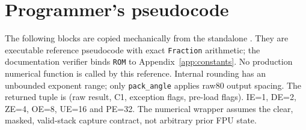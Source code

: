 \documentclass[11pt]{article}
\begin{document}


\clearpage
\section{Programmer's pseudocode}
\label{app:pseudocode}

The following blocks are copied mechanically from the standalone
. They are executable reference pseudocode with exact
\texttt{Fraction} arithmetic; the documentation verifier binds
\texttt{ROM} to Appendix~\ref{app:constants}. No production numerical
function is called by this reference. Internal rounding has an unbounded
exponent range; only \texttt{pack\_angle} applies raw80 output spacing.
The returned tuple is (raw result, C1, exception flags, pre-load flags).
IE=1, DE=2, ZE=4, OE=8, UE=16 and PE=32. The numerical wrapper assumes the
clear, masked, valid-stack capture contract, not arbitrary prior FPU state.


\end{document}

